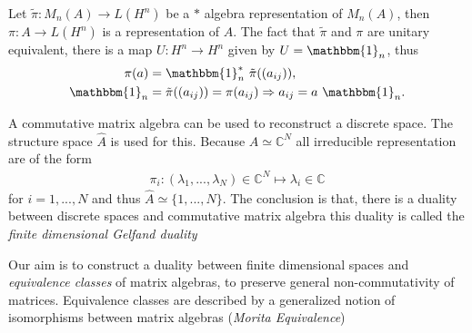     Let $\tilde{\pi}:M_n(A) \rightarrow L(H^n)$ be a $*$ algebra
    representation of $M_n(A)$, then $\pi: A \rightarrow L(H^n)$ is a representation of $A$.
    The fact that $\tilde{\pi}$ and $\pi$ are unitary equivalent, there is
    a map $U: H^n \rightarrow H^n$ given by $U=\mathbbm{1}_n$, thus
    \begin{align}
        \pi (a) &= \mathbbm{1}_n^*\ \tilde{\pi}((a_{ij})), \\
        \mathbbm{1}_n &= \tilde{\pi}((a_{ij})) = \pi (a_{ij})
    \Rightarrow a_{ij} = a\ \mathbbm{1}_n.
    \end{align}


A commutative matrix algebra can be used to reconstruct a discrete space.
The structure space $\hat{A}$ is used for this. Because $A \simeq
\mathbb{C}^N$ all
irreducible representation are of the form
\begin{align}
   \pi _i:(\lambda_1,...,\lambda_N)\in \mathbb{C}^N \mapsto \lambda_i \in
   \mathbb{C}
\end{align}
for $i = 1,...,N$ and thus $\hat{A} \simeq \{1,...,N\}$.
The conclusion is that, there is a duality between discrete spaces and
commutative matrix algebra this duality is called the \textit{finite
dimensional Gelfand duality}

Our aim is to construct a duality between finite dimensional spaces and
\textit{equivalence classes} of matrix algebras, to preserve general
non-commutativity of matrices.  Equivalence classes are described by a
generalized notion of isomorphisms between matrix algebras (\textit{Morita
Equivalence})

